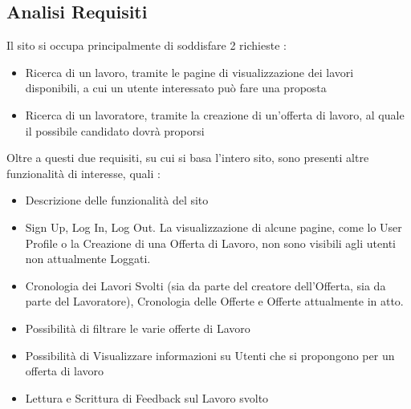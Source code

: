 	\subsection{Analisi Requisiti} 
	Il sito si occupa principalmente di soddisfare 2 richieste :
	\begin{itemize}
		\item Ricerca di un lavoro, tramite le pagine di visualizzazione dei lavori disponibili, a cui un utente interessato può fare una proposta
		\item Ricerca di un lavoratore, tramite la creazione di un’offerta di lavoro, al quale il possibile candidato dovrà proporsi
	\end{itemize}
	Oltre a questi due requisiti, su cui si basa l’intero sito, sono presenti altre funzionalità di interesse, quali :
	\begin{itemize}
		\item Descrizione delle funzionalità del sito
		\item Sign Up, Log In, Log Out. La visualizzazione di alcune pagine, come lo User Profile o la Creazione di una Offerta di Lavoro, non sono visibili agli utenti non attualmente Loggati.
		\item Cronologia dei Lavori Svolti (sia da parte del creatore dell’Offerta, sia da parte del Lavoratore), Cronologia delle Offerte e Offerte attualmente in atto.
		\item Possibilità di filtrare le varie offerte di Lavoro
		\item Possibilità di Visualizzare informazioni su Utenti che si propongono per un offerta di lavoro
		\item Lettura e Scrittura di Feedback sul Lavoro svolto
	\end{itemize}